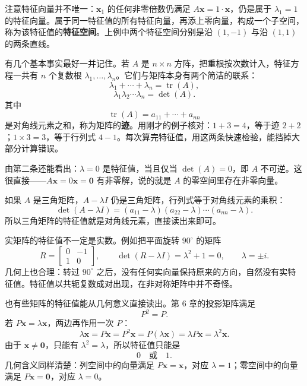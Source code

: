 \documentclass[UTF8,a4paper,12pt]{ctexart}
\numberwithin{equation}{section}
\begin{document}
	注意特征向量并不唯一：$\bm{x}_1$ 的任何非零倍数仍满足 $A\bm{x}=1\cdot\bm{x}$，仍是属于 $\lambda_1=1$ 的特征向量。属于同一特征值的所有特征向量，再添上零向量，构成一个子空间，称为该特征值的\textbf{特征空间}。上例中两个特征空间分别是沿 $(1,-1)$ 与沿 $(1,1)$ 的两条直线。

	有几个基本事实最好一并记住。若 $A$ 是 $n\times n$ 方阵，把重根按次数计入，特征方程一共有 $n$ 个复数根 $\lambda_1,\ldots,\lambda_n$。它们与矩阵本身有两个简洁的联系：
	\begin{equation}\label{eq:7.14}
	\lambda_1+\cdots+\lambda_n
	=\operatorname{tr}(A),
	\end{equation}
	\begin{equation}\label{eq:7.15}
	\lambda_1\lambda_2\cdots\lambda_n
	=\det(A).
	\end{equation}
	其中
	\begin{equation}\label{eq:7.16}
	\operatorname{tr}(A)=a_{11}+\cdots+a_{nn}
	\end{equation}
	是对角线元素之和，称为矩阵的\textbf{迹}。用刚才的例子核对：$1+3=4$，等于迹 $2+2$；$1\times 3=3$，等于行列式 $4-1$。每次算完特征值，用这两条快速检验，能挡掉大部分计算错误。

	由第二条还能看出：$\lambda=0$ 是特征值，当且仅当 $\det(A)=0$，即 $A$ 不可逆。这很直接——$A\bm{x}=0\bm{x}=\bm{0}$ 有非零解，说的就是 $A$ 的零空间里存在非零向量。

	如果 $A$ 是三角矩阵，$A-\lambda I$ 仍是三角矩阵，行列式等于对角线元素的乘积：
	\begin{equation}\label{eq:7.17}
	\det(A-\lambda I)=(a_{11}-\lambda)(a_{22}-\lambda)\cdots(a_{nn}-\lambda).
	\end{equation}
	所以三角矩阵的特征值就是对角线元素，直接读出来即可。

	实矩阵的特征值不一定是实数。例如把平面旋转 $90^\circ$ 的矩阵
	\begin{equation}\label{eq:7.18}
	R=
	\begin{bmatrix}
		0&-1\\
		1&0
	\end{bmatrix},
	\qquad
	\det(R-\lambda I)=\lambda^2+1=0,
	\qquad
	\lambda=\pm i.
	\end{equation}
	几何上也合理：转过 $90^\circ$ 之后，没有任何实向量保持原来的方向，自然没有实特征值。特征值以共轭复数成对出现，在非对称矩阵中并不奇怪。

	也有些矩阵的特征值能从几何意义直接读出。第 6 章的投影矩阵满足
	\begin{equation}\label{eq:7.19}
	P^2=P.
	\end{equation}
	若 $P\bm{x}=\lambda\bm{x}$，两边再作用一次 $P$：
	\begin{equation}\label{eq:7.20}
	\lambda\bm{x}=P\bm{x}=P^2\bm{x}=P(\lambda\bm{x})=\lambda P\bm{x}=\lambda^2\bm{x}.
	\end{equation}
	由于 $\bm{x}\neq\bm{0}$，只能有 $\lambda^2=\lambda$，所以特征值只能是
	\begin{equation}\label{eq:7.21}
	0\quad\text{或}\quad 1.
	\end{equation}
	几何含义同样清楚：列空间中的向量满足 $P\bm{x}=\bm{x}$，对应 $\lambda=1$；零空间中的向量满足 $P\bm{x}=\bm{0}$，对应 $\lambda=0$。
\end{document}
